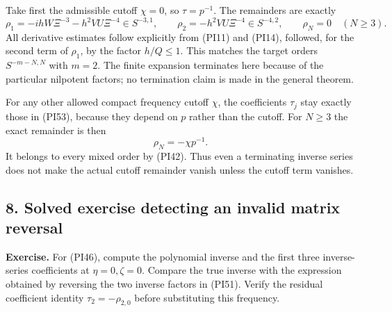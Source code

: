\documentclass[
  11pt,
]{article}
\makeatletter
\let\ReaderOriginalAnchorStart\hyper@anchorstart
\let\ReaderOriginalAnchorEnd\hyper@anchorend
\let\ReaderPendingAliases\@empty
\def\ReaderArmAliases#1{\gdef\ReaderPendingAliases{#1}}
\def\hyper@anchorstart#1{\ReaderIfNativeAnchorTF{#1}{\ReaderPendingAliases\global\let\ReaderPendingAliases\@empty}{}\ReaderOriginalAnchorStart{#1}}
\makeatother
\begin{document}
Take first the admissible cutoff \(\chi=0\), so \(\tau=p^{-1}\). The
remainders are exactly \[
 \rho_1=-ihW\Xi^{-3}-h^2VU\Xi^{-4}\in S^{-3,1},\qquad
 \rho_2=-h^2VU\Xi^{-4}\in S^{-4,2},\qquad
 \rho_N=0\quad(N\geq3).
 \tag{PI54}
\] All derivative estimates follow explicitly from (PI11) and (PI14),
followed, for the second term of \(\rho_1\), by the factor \(h/Q\leq1\).
This matches the target orders \(S^{-m-N,N}\) with \(m=2\). The finite
expansion terminates here because of the particular nilpotent factors;
no termination claim is made in the general theorem.

For any other allowed compact frequency cutoff \(\chi\), the
coefficients \(\tau_j\) stay exactly those in (PI53), because they
depend on \(p\) rather than the cutoff. For \(N\geq3\) the exact
remainder is then \[
 \rho_N=-\chi p^{-1}.
 \tag{PI55}
\] It belongs to every mixed order by (PI42). Thus even a terminating
inverse series does not make the actual cutoff remainder vanish unless
the cutoff term vanishes.

\ReaderArmAliases{\ReaderOriginalAnchorStart{AN03-PIN-008}\ReaderOriginalAnchorEnd\begingroup\expandafter\def\csname @currentHref\endcsname{AN03-PIN-008}\label{AN03-PIN-008}\endgroup\ReaderOriginalAnchorStart{an03-pin-008-solved-exercise-detecting-an-invalid-matrix-reversal}\ReaderOriginalAnchorEnd\begingroup\expandafter\def\csname @currentHref\endcsname{an03-pin-008-solved-exercise-detecting-an-invalid-matrix-reversal}\label{an03-pin-008-solved-exercise-detecting-an-invalid-matrix-reversal}\endgroup\ReaderOriginalAnchorStart{8-solved-exercise-detecting-an-invalid-matrix-reversal}\ReaderOriginalAnchorEnd\begingroup\expandafter\def\csname @currentHref\endcsname{8-solved-exercise-detecting-an-invalid-matrix-reversal}\label{8-solved-exercise-detecting-an-invalid-matrix-reversal}\endgroup}
\subsection{8. Solved exercise detecting an invalid matrix
reversal}\label{solved-exercise-detecting-an-invalid-matrix-reversal}

\textbf{Exercise.} For (PI46), compute the polynomial inverse and the
first three inverse-series coefficients at \(\eta=0,\zeta=0\). Compare
the true inverse with the expression obtained by reversing the two
inverse factors in (PI51). Verify the residual coefficient identity
\(\tau_2=-\rho_{2,0}\) before substituting this frequency.
\end{document}
